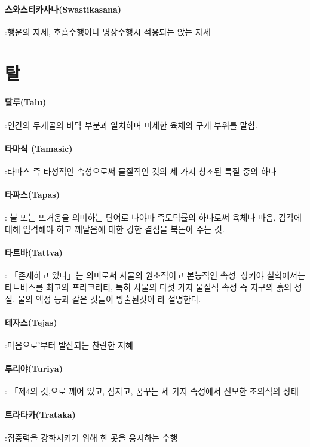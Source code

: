 \documentclass[12pt, a4paper, oneside]{book}
\let\stdsection\section
\renewcommand\section{\newpage\stdsection}
\begin{document}
\paragraph{스와스티카사나(Swastikasana)} :행운의 자세, 호흡수행이나 명상수행시 적용되는 앉는 자세

\newpage
\section{탈}

\paragraph{탈루(Talu)} :인간의 두개골의 바닥 부분과 일치하며 미세한 육체의 구개 부위를 말함.

\paragraph{타마식 (Tamasic)} :타마스 즉 타성적인 속성으로써 물질적인 것의 세 가지 창조된 특질 중의 하나

\paragraph{타파스(Tapas)} : 불 또는 뜨거움을 의미하는 단어로 나야마 즉도덕률의 하나로써 육체나 마음, 감각에 대해 엄격해야 하고 깨달음에 대한 강한 결심을 북돋아 주는 것.

\paragraph{타트바(Tattva)} : 「존재하고 있다」는 의미로써 사물의 원초적이고 본능적인 속성. 상키야 철학에서는 타트바스를 최고의 프라크리티, 특히 사물의 다섯 가지 물질적 속성 즉 지구의 흙의 성질, 물의 액성 등과 같은 것들이 방출된것이 라 설명한다.

\paragraph{테자스(Tejas)} :마음으로'부터 발산되는 찬란한 지혜

\paragraph{투리야(Turiya)} : 「제4의 것,으로 깨어 있고, 잠자고, 꿈꾸는 세 가지 속성에서 진보한 초의식의 상태

\paragraph{트라타카(Trataka)} :집중력을 강화시키기 위해 한 곳을 응시하는 수행
\end{document}
